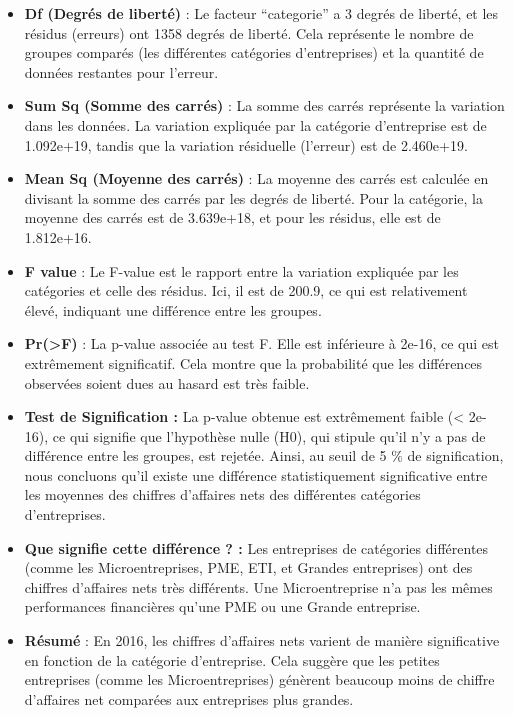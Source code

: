 \documentclass[mstat,12pt]{unswthesis}
\begin{document}
\begin{itemize}
\item
  \textbf{Df (Degrés de liberté)} : Le facteur ``categorie'' a 3 degrés
  de liberté, et les résidus (erreurs) ont 1358 degrés de liberté. Cela
  représente le nombre de groupes comparés (les différentes catégories
  d'entreprises) et la quantité de données restantes pour l'erreur.
\item
  \textbf{Sum Sq (Somme des carrés)} : La somme des carrés représente la
  variation dans les données. La variation expliquée par la catégorie
  d'entreprise est de 1.092e+19, tandis que la variation résiduelle
  (l'erreur) est de 2.460e+19.
\item
  \textbf{Mean Sq (Moyenne des carrés)} : La moyenne des carrés est
  calculée en divisant la somme des carrés par les degrés de liberté.
  Pour la catégorie, la moyenne des carrés est de 3.639e+18, et pour les
  résidus, elle est de 1.812e+16.
\item
  \textbf{F value} : Le F-value est le rapport entre la variation
  expliquée par les catégories et celle des résidus. Ici, il est de
  200.9, ce qui est relativement élevé, indiquant une différence entre
  les groupes.
\item
  \textbf{Pr(\textgreater F)} : La p-value associée au test F. Elle est
  inférieure à 2e-16, ce qui est extrêmement significatif. Cela montre
  que la probabilité que les différences observées soient dues au hasard
  est très faible.
\item
  \textbf{Test de Signification :} La p-value obtenue est extrêmement
  faible (\textless{} 2e-16), ce qui signifie que l'hypothèse nulle
  (H0), qui stipule qu'il n'y a pas de différence entre les groupes, est
  rejetée. Ainsi, au seuil de 5 \% de signification, nous concluons
  qu'il existe une différence statistiquement significative entre les
  moyennes des chiffres d'affaires nets des différentes catégories
  d'entreprises.
\item
  \textbf{Que signifie cette différence ? :} Les entreprises de
  catégories différentes (comme les Microentreprises, PME, ETI, et
  Grandes entreprises) ont des chiffres d'affaires nets très différents.
  Une Microentreprise n'a pas les mêmes performances financières qu'une
  PME ou une Grande entreprise.
\item
  \textbf{Résumé} : En 2016, les chiffres d'affaires nets varient de
  manière significative en fonction de la catégorie d'entreprise. Cela
  suggère que les petites entreprises (comme les Microentreprises)
  génèrent beaucoup moins de chiffre d'affaires net comparées aux
  entreprises plus grandes.
\end{itemize}
\end{document}

